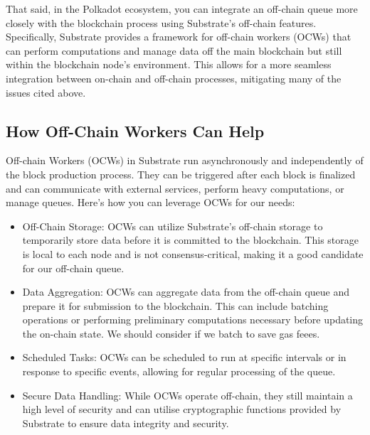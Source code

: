 \documentclass{tufte-handout}
\begin{document}
That said, in the Polkadot ecosystem, you can integrate an off-chain queue more closely with the blockchain process using Substrate's off-chain features. Specifically,
Substrate provides a framework for off-chain workers (OCWs) that can perform computations and manage data off the main blockchain but still within the blockchain
node's environment. This allows for a more seamless integration between on-chain and off-chain processes, mitigating many of the issues cited above.

\subsection{How Off-Chain Workers Can Help}\label{sec:headings}
Off-chain Workers (OCWs) in Substrate run asynchronously and independently of the block production process. They can be triggered after each block is finalized and can communicate
with external services, perform heavy computations, or manage queues. Here's how you can leverage OCWs for our needs:
\begin{itemize}
\item Off-Chain Storage: OCWs can utilize Substrate's off-chain storage to temporarily store data before it is committed to the blockchain. This storage is local to each
node and is not consensus-critical, making it a good candidate for our off-chain queue.
\item Data Aggregation: OCWs can aggregate data from the off-chain queue and prepare it for submission to the blockchain. This can include batching operations or
performing preliminary computations necessary before updating the on-chain state. We should consider if we batch to save gas feees.
\item Scheduled Tasks: OCWs can be scheduled to run at specific intervals or in response to specific events, allowing for regular processing of the queue.
\item Secure Data Handling: While OCWs operate off-chain, they still maintain a high level of security and can utilise cryptographic functions provided by
Substrate to ensure data integrity and security.
\end{itemize}
\end{document}
